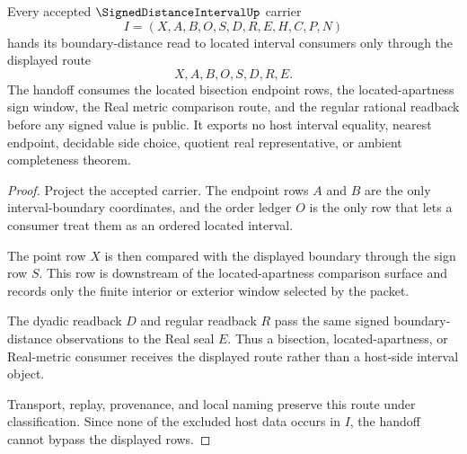 \begin{theorem}
\label{thm:signed-distance-interval-located-handoff}
Every accepted $\SignedDistanceIntervalUp$ carrier
$$
I=(X,A,B,O,S,D,R,E,H,C,P,N)
$$
hands its boundary-distance read to located interval consumers only through the displayed route
$$
X,A,B,O,S,D,R,E .
$$
The handoff consumes the located bisection endpoint rows, the located-apartness sign window, the Real metric comparison route, and the regular rational readback before any signed value is public. It exports no host interval equality, nearest endpoint, decidable side choice, quotient real representative, or ambient completeness theorem.
\end{theorem}
\begin{proof}
Project the accepted carrier. The endpoint rows $A$ and $B$ are the only interval-boundary coordinates, and the order ledger $O$ is the only row that lets a consumer treat them as an ordered located interval.

The point row $X$ is then compared with the displayed boundary through the sign row $S$. This row is downstream of the located-apartness comparison surface and records only the finite interior or exterior window selected by the packet.

The dyadic readback $D$ and regular readback $R$ pass the same signed boundary-distance observations to the Real seal $E$. Thus a bisection, located-apartness, or Real-metric consumer receives the displayed route rather than a host-side interval object.

Transport, replay, provenance, and local naming preserve this route under classification. Since none of the excluded host data occurs in $I$, the handoff cannot bypass the displayed rows.
\end{proof}

